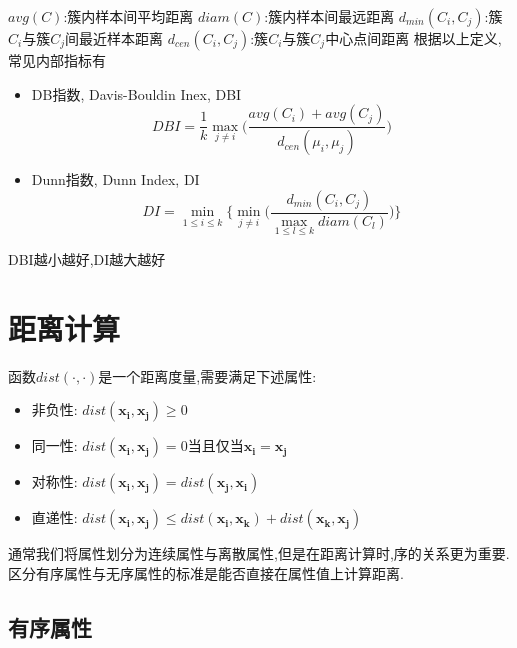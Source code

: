 $avg(C)$:簇内样本间平均距离
$diam(C)$:簇内样本间最远距离
$d_{min}(C_i, C_j)$:簇$C_i$与簇$C_j$间最近样本距离
$d_{cen}(C_i, C_j)$:簇$C_i$与簇$C_j$中心点间距离
根据以上定义,常见内部指标有
\begin{itemize}
\item DB指数, Davis-Bouldin Inex, DBI
    \begin{equation}
    DBI=\frac{1}{k}\max_{j\ne i}\Big(\frac{avg(C_i)+avg(C_j)}{d_{cen}(\mu_i,\mu_j)}\Big)
    \end{equation}
\item Dunn指数, Dunn Index, DI
    \begin{equation}
    DI=\min_{1\le i \le k}\Big\{\min_{j\ne i}\Big(\frac{d_{min}(C_i,C_j)}{\max_{1\le l \le k}diam(C_l)}\Big)\Big\}
    \end{equation}
\end{itemize}
DBI越小越好,DI越大越好

\section{距离计算}

函数$dist(\cdot, \cdot)$是一个距离度量,需要满足下述属性:
\begin{itemize}
\item 非负性: $dist(\mathbf{x_i,x_j})\ge0$
\item 同一性: $dist(\mathbf{x_i,x_j})=0$当且仅当$\mathbf{x_i=x_j}$
\item 对称性: $dist(\mathbf{x_i,x_j})=dist(\mathbf{x_j,x_i})$
\item 直递性: $dist(\mathbf{x_i,x_j}) \le dist(\mathbf{x_i,x_k}) + dist(\mathbf{x_k,x_j})$
\end{itemize}

通常我们将属性划分为连续属性与离散属性,但是在距离计算时,序的关系更为重要.区分有序属性与无序属性的标准是能否直接在属性值上计算距离.

\subsection*{有序属性}

